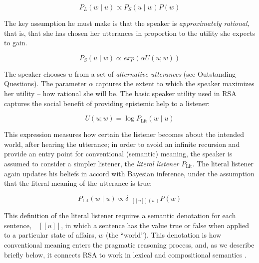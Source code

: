 \documentclass[]{elsarticle}
\newcommand{\denote}[1]{\mbox{ $[\![ #1 ]\!]$}}
\begin{document}
$$P_L(w\mid u) \propto P_S(u \mid w)P(w)$$

The key assumption he must make is that the speaker is
\emph{approximately rational,} that is, that she has chosen her
utterances in proportion to the utility she expects to gain.

$$P_S(u\mid w) \propto exp(\alpha
U(u;w))$$

The speaker chooses $u$ from a set of \emph{alternative utterances}
(see Outstanding Questions). The parameter $\alpha$
captures the extent to which the speaker maximizes her utility --
how rational she will be. The basic speaker utility used in RSA
captures the social benefit of providing epistemic help to a listener:

$$U(u;w) = \log P_{\text{Lit}}(w \mid u)$$

This expression measures how certain the listener becomes about the intended world, after hearing the utterance; 
in order to avoid an infinite recursion and provide an entry point for conventional (semantic) meaning, the speaker is
assumed to consider a simpler listener, the \emph{literal listener}
$P_{\text{Lit}}$. The literal listener again updates his beliefs in
accord with Bayesian inference, under the assumption that the literal
meaning of the utterance is true:

$$P_{\text{Lit}}(w\mid u) \propto \delta_{\denote{u}(w)}P(w)$$

This definition of the literal listener requires a semantic denotation
for each sentence, $\denote{u}$, in which a sentence
has the value true or false when applied to a particular state of
affairs, $w$ (the ``world''). 
This denotation is how conventional meaning enters the pragmatic reasoning process, 
and, as we describe briefly below, it connects RSA to work in lexical and
compositional semantics \citep{heim1998,dowty2012}.

\end{document}
